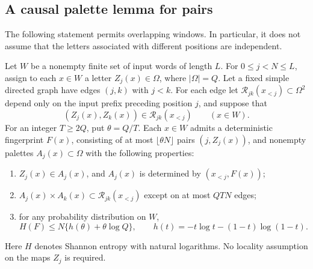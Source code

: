\subsection{A causal palette lemma for pairs}

The following statement permits overlapping windows.  In particular,
it does not assume that the letters associated with different
positions are independent.

\begin{lemma}\label{gen:palettes}
Let $W$ be a nonempty finite set of input words of length $L$.
For $0\le j<N\le L$, assign to each $x\in W$ a letter
$Z_j(x)\in\Omega$, where $|\Omega|=Q$.  Let a fixed simple directed
graph have edges $(j,k)$ with $j<k$.  For each edge let
$\mathcal R_{jk}(x_{<j})\subset\Omega^2$ depend only on the input
prefix preceding position $j$, and suppose that
\[
 (Z_j(x),Z_k(x))\in\mathcal R_{jk}(x_{<j})
             \qquad(x\in W).
\]
For an integer $T\ge2Q$, put $\theta=Q/T$.  Each $x\in W$ admits
a deterministic fingerprint $F(x)$, consisting of at most
$\lfloor\theta N\rfloor$ pairs $(j,Z_j(x))$, and nonempty palettes
$A_j(x)\subset\Omega$ with the following properties:
\begin{enumerate}[label=(\roman*)]
\item $Z_j(x)\in A_j(x)$, and $A_j(x)$ is determined by
      $(x_{<j},F(x))$;
\item $A_j(x)\times A_k(x)\subset\mathcal R_{jk}(x_{<j})$
      except on at most $QTN$ edges;
\item for any probability distribution on $W$,
\[
 H(F)\le N\{h(\theta)+\theta\log Q\},\qquad
 h(t)=-t\log t-(1-t)\log(1-t).
\]
\end{enumerate}
Here $H$ denotes Shannon entropy with natural logarithms.
No locality assumption on the maps $Z_j$ is required.
\end{lemma}
